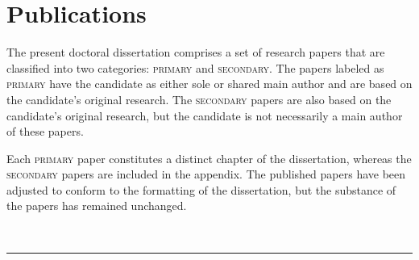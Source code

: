 
\chapter[publications]{Publications}

The present doctoral dissertation comprises a set of research papers that are classified into two categories: \textsc{primary} and \textsc{secondary}. The papers labeled as \textsc{primary} have the candidate as either sole or shared main author and are based on the candidate's original research. The \textsc{secondary} papers are also based on the candidate's original research, but the candidate is not necessarily a main author of these papers.

\noindent Each \textsc{primary} paper constitutes a distinct chapter of the dissertation, whereas the \textsc{secondary} papers are included in the appendix. The published papers have been adjusted to conform to the formatting of the dissertation, but the substance of the papers has remained unchanged.

\vspace{5mm}

\raggedright\par\noindent\hspace{8mm}{\Large\scshape primary}\\[-2mm]

\raggedleft\rule{\textwidth - 8mm}{0.4pt}

\begin{enumerate}[leftmargin=8mm,topsep=0mm,label={[\Alph*]}]

    \item {}
    \item {} 
    \item {}

\end{enumerate}

\newpage

\raggedright\par\noindent\hspace{8mm}{\Large\scshape secondary}\\[-2mm]

